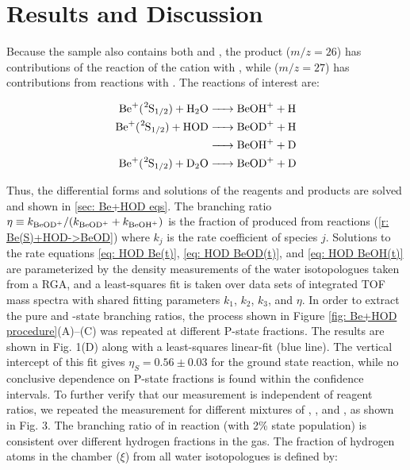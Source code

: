 \section{Results and Discussion}

Because the  sample also contains both  and , the product  ($m/z = 26$) has contributions of the reaction of the cation with , while  ($m/z = 27$) has contributions from reactions with . The reactions of interest are:

\begin{align}
	\ce{Be+(^2S1/2) + H2O & -> BeOH+ + H} \nonumber \\
	\ce{Be+(^2S1/2) + HOD & -> BeOD+ + H} \label{r: Be(S)+HOD->BeOD} \\
	\ce{& -> BeOH+ + D} \label{r: Be(S)+HOD->BeOH} \\
	\ce{Be+(^2S1/2) + D2O & -> BeOD+ + D} \label{r: Be(S)+D2O->BeOD}
\end{align}

Thus, the differential forms and solutions of the reagents and products are solved and shown in \ref{sec: Be+HOD eqs}. The branching ratio $\eta \equiv k_{\ce{BeOD+}}/(k_{\ce{BeOD+}} + k_{\ce{BeOH+}})$ is the fraction of  produced from reactions (\ref{r: Be(S)+HOD->BeOD}) where $k_j$ is the rate coefficient of species $j$. Solutions to the rate equations \ref{eq: HOD Be(t)}, \ref{eq: HOD BeOD(t)}, and \ref{eq: HOD BeOH(t)} are parameterized by the density measurements of the water isotopologues taken from a RGA, and a least-squares fit is taken over data sets of integrated TOF mass spectra with shared fitting parameters $k_1$, $k_2$, $k_3$, and $\eta$. In order to extract the pure  and -state branching ratios, the process shown in Figure \ref{fig: Be+HOD procedure}(A)–(C) was repeated at different P-state fractions. The results are shown in Fig. 1(D) along with a least-squares linear-fit (blue line). The vertical intercept of this fit gives $\eta_S = 0.56 \pm 0.03$ for the ground  state reaction, while no conclusive dependence on P-state fractions is found within the confidence intervals. To further verify that our measurement is independent of reagent ratios, we repeated the measurement for different mixtures of , , and , as shown in Fig. 3. The branching ratio of  in reaction  (with 2\%  state population) is consistent over different hydrogen fractions in the gas. The fraction of hydrogen atoms in the chamber ($\xi$) from all water isotopologues is defined by:

